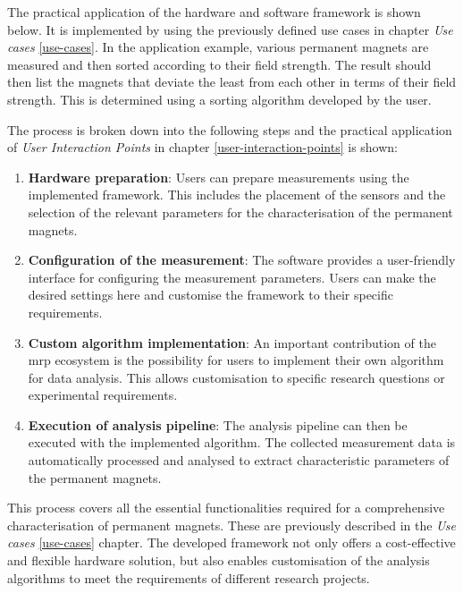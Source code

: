The practical application of the hardware and software framework is
shown below. It is implemented by using the previously defined use cases
in chapter \emph{Use cases} \ref{use-cases}. In the application example,
various permanent magnets are measured and then sorted according to
their field strength. The result should then list the magnets that
deviate the least from each other in terms of their field strength. This
is determined using a sorting algorithm developed by the user.

The process is broken down into the following steps and the practical
application of \emph{User Interaction Points} in chapter
\ref{user-interaction-points} is shown:

\begin{enumerate}
\def\labelenumi{\arabic{enumi}.}
\item
  \textbf{Hardware preparation}: Users can prepare measurements using
  the implemented framework. This includes the placement of the sensors
  and the selection of the relevant parameters for the characterisation
  of the permanent magnets.
\item
  \textbf{Configuration of the measurement}: The software provides a
  user-friendly interface for configuring the measurement parameters.
  Users can make the desired settings here and customise the framework
  to their specific requirements.
\item
  \textbf{Custom algorithm implementation}: An important contribution of
  the \gls{mrp} ecosystem is the possibility for users to implement
  their own algorithm for data analysis. This allows customisation to
  specific research questions or experimental requirements.
\item
  \textbf{Execution of analysis pipeline}: The analysis pipeline can
  then be executed with the implemented algorithm. The collected
  measurement data is automatically processed and analysed to extract
  characteristic parameters of the permanent magnets.
\end{enumerate}

\newpage

This process covers all the essential functionalities required for a
comprehensive characterisation of permanent magnets. These are
previously described in the \emph{Use cases} \ref{use-cases} chapter.
The developed framework not only offers a cost-effective and flexible
hardware solution, but also enables customisation of the analysis
algorithms to meet the requirements of different research projects.

